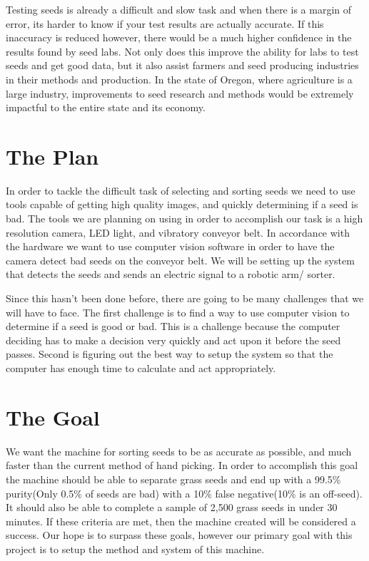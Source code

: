 \documentclass[10pt, letterpaper, twoside, draftclsnofoot, onecolumn. notitlepage]{article}
\begin{document}
Testing seeds is already a difficult and slow task and when there is a margin of error, its harder to know if your test results are actually accurate. If this inaccuracy is reduced however, there would be a much higher confidence in the results found by seed labs. Not only does this improve the ability for labs to test seeds and get good data, but it also assist farmers and seed producing industries in their methods and production. In the state of Oregon, where agriculture is a large industry, improvements to seed research and methods would be extremely impactful to the entire state and its economy. 

\section{The Plan}
\quad In order to tackle the difficult task of selecting and sorting seeds we need to use tools capable of getting high quality images, and quickly determining if a seed is bad. The tools we are planning on using in order to accomplish our task is a high resolution camera, LED light, and vibratory conveyor belt. In accordance with the hardware we want to use computer vision software in order to have the camera detect bad seeds on the conveyor belt. We will be setting up the system that detects the seeds and sends an electric signal to a robotic arm/ sorter.

Since this hasn't been done before, there are going to be many challenges that we will have to face. The first challenge is to find a way to use computer vision to determine if a seed is good or bad. This is a challenge because the computer deciding has to make a decision very quickly and act upon it before the seed passes. Second is figuring out the best way to setup the system so that the computer has enough time to calculate and act appropriately. 

\section{The Goal}
\quad We want the machine for sorting seeds to be as accurate as possible, and much faster than the current method of hand picking. In order to accomplish this goal the machine should be able to separate grass seeds and end up with a 99.5\% purity(Only 0.5\% of seeds are bad) with a 10\% false negative(10\% is an off-seed). It should also be able to complete a sample of 2,500 grass seeds in under 30 minutes. If these criteria are met, then the machine created will be considered a success. Our hope is to surpass these goals, however our primary goal with this project is to setup the method and system of this machine.

	
\end{document}
